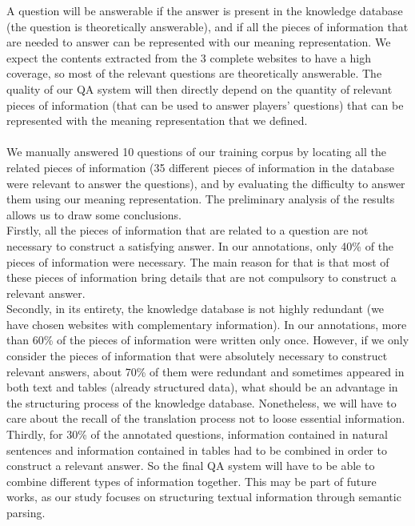 \documentclass[12pt]{article}
\begin{document}
A question will be answerable if the answer is present in the knowledge database (the question is theoretically answerable), and if all the pieces of information that are needed to answer can be represented with our meaning representation. We expect the contents extracted from the 3 complete websites to have a high coverage, so most of the relevant questions are theoretically answerable. The quality of our QA system will then directly depend on the quantity of relevant pieces of information (that can be used to answer players' questions) that can be represented with the meaning representation that we defined.\\
\\
We manually answered 10 questions of our training corpus by locating all the related pieces of information (35 different pieces of information in the database were relevant to answer the questions), and by evaluating the difficulty to answer them using our meaning representation. The preliminary analysis of the results allows us to draw some conclusions.\\
Firstly, all the pieces of information that are related to a question are not necessary to construct a satisfying answer. In our annotations, only 40\% of the pieces of information were necessary. The main reason for that is that most of these pieces of information bring details that are not compulsory to construct a relevant answer.\\
Secondly, in its entirety, the knowledge database is not highly redundant (we have chosen websites with complementary information). In our annotations, more than 60\% of the pieces of information were written only once. However, if we only consider the pieces of information that were absolutely necessary to construct relevant answers, about 70\% of them were redundant and sometimes appeared in both text and tables (already structured data), what should be an advantage in the structuring process of the knowledge database. Nonetheless, we will have to care about the recall of the translation process not to loose essential information.\\
Thirdly, for 30\% of the annotated questions, information contained in natural sentences and information contained in tables had to be combined in order to construct a relevant answer. So the final QA system will have to be able to combine different types of information together. This may be part of future works, as our study focuses on structuring textual information through semantic parsing.\\
\end{document}
